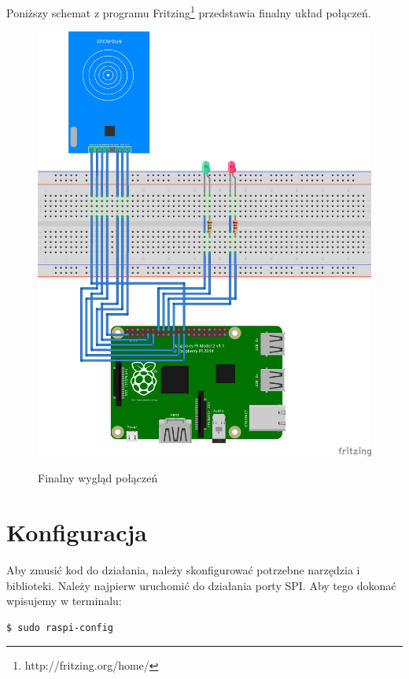\newpage

Poniższy schemat z programu Fritzing\footnote{http://fritzing.org/home/} przedstawia finalny układ połączeń.

\begin{figure}[h!]
	\centering
	\includegraphics[width=\linewidth]{img/projekt_bb.png}
	\label{fig:projekt}
	\caption[Finalny wygląd połączeń]{Finalny wygląd połączeń}
\end{figure}

\section{Konfiguracja}

Aby zmusić kod do działania, należy skonfigurować potrzebne narzędzia i biblioteki. Należy najpierw uruchomić do działania porty SPI. Aby tego dokonać wpisujemy w terminalu:

\begin{verbatim}
$ sudo raspi-config
\end{verbatim}

